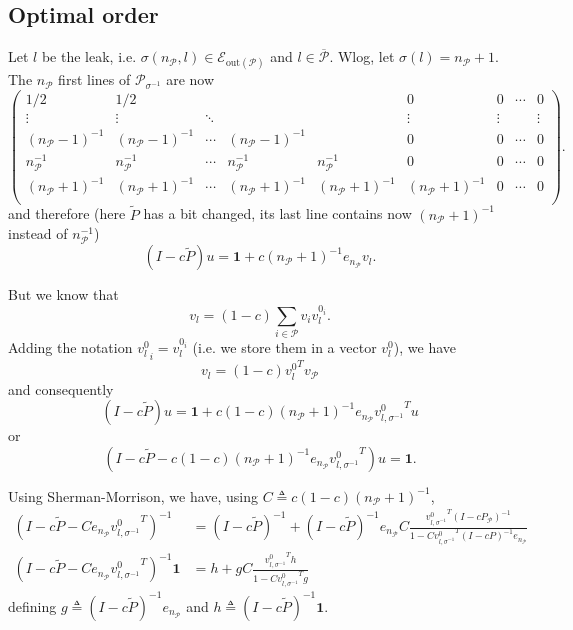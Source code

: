 \documentclass{article}
\newcommand{\1}{\mathbf{1}}
\theoremstyle{definition}
\begin{document}
\subsection{Optimal order}
Let \(l\) be the leak, i.e. \(\sigma(n_\mathcal{P},l) \in \mathcal{E}_{\text{out}(\mathcal{P})}\) and \(l \in \overline{\mathcal{P}}\).
Wlog, let \(\sigma(l) = n_{\mathcal{P}}+1\).
The \(n_\mathcal{P}\) first lines of \(\mathcal{P}_{\sigma^{-1}}\) are now
\[
  \begin{pmatrix}
    1/2 & 1/2 & & & & 0 & 0 & \cdots & 0\\
    \vdots & \vdots & \ddots & & & \vdots & \vdots & & \vdots \\
    (n_\mathcal{P}-1)^{-1} & (n_\mathcal{P}-1)^{-1} & \cdots & (n_\mathcal{P}-1)^{-1} & & 0 & 0 & \cdots & 0\\
    n_\mathcal{P}^{-1} & n_\mathcal{P}^{-1} & \cdots & n_\mathcal{P}^{-1} & n_\mathcal{P}^{-1} & 0 & 0 & \cdots & 0\\
    (n_\mathcal{P}+1)^{-1} & (n_\mathcal{P}+1)^{-1} & \cdots & (n_\mathcal{P}+1)^{-1} & (n_\mathcal{P}+1)^{-1} & (n_\mathcal{P}+1)^{-1} & 0 & \cdots & 0\\
  \end{pmatrix}.
\]
and therefore (here \(\tilde{P}\) has a bit changed, its last line contains now \((n_\mathcal{P}+1)^{-1}\) instead of \(n_\mathcal{P}^{-1}\))
\[ (I - c\tilde{P})u = \1 + c (n_\mathcal{P}+1)^{-1} e_{n_\mathcal{P}} v_l. \]

But we know that
\[ v_l = (1-c) \sum_{i \in \mathcal{P}} v_i v_l^{0_i}. \]
Adding the notation \({v_l^0}_i = v_l^{0_i}\) (i.e. we store them in a vector \(v_l^0\)),
we have
\[ v_l = (1-c) {v_l^0}^T v_\mathcal{P} \]
and consequently
\[ (I - c\tilde{P})u = \1 + c (1-c) (n_\mathcal{P}+1)^{-1} e_{n_\mathcal{P}} {v_{l,\sigma^{-1}}^0}^T u \]
or
\[ (I - c\tilde{P} - c (1-c) (n_\mathcal{P}+1)^{-1} e_{n_\mathcal{P}} {v_{l,\sigma^{-1}}^0}^T)u = \1. \]

Using Sherman-Morrison, we have, using \(C \triangleq c(1-c)(n_\mathcal{P}+1)^{-1}\),
\begin{align*}
  (I - c\tilde{P} - C e_{n_\mathcal{P}} {v_{l,\sigma^{-1}}^0}^T)^{-1} & = (I - c\tilde{P})^{-1} + (I - c\tilde{P})^{-1}e_{n_\mathcal{P}} C \frac{{v_{l,\sigma^{-1}}^0}^T(I-cP_\mathcal{P})^{-1}}{1 - C{v_{l,\sigma^{-1}}^0}^T(I-cP)^{-1}e_{n_\mathcal{P}}}\\
  (I - c\tilde{P} - C e_{n_\mathcal{P}} {v_{l,\sigma^{-1}}^0}^T)^{-1}\1 & = h + g C \frac{{v_{l,\sigma^{-1}}^0}^Th}{1 - C {v_{l,\sigma^{-1}}^0}^Tg}
\end{align*}
defining \(g \triangleq (I - c\tilde{P})^{-1}e_{n_\mathcal{P}}\) and \(h \triangleq (I - c\tilde{P})^{-1}\1\).
\end{document}
